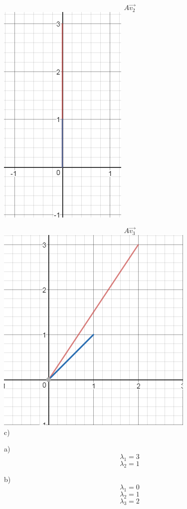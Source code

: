 \documentclass[12pt]{article}
\newenvironment{problem}[2][Problem]{\begin{trivlist}
\item[\hskip \labelsep {\bfseries #1}\hskip \labelsep {\bfseries #2.}]}{\end{trivlist}}
\begin{document}
\[A\vec{v_2} \]
\includegraphics{Av2}

\[A\vec{v_3} \]
\includegraphics{Av3}\\
c)\\

\begin{problem}{12}
\end{problem}
a)\\
\[\lambda_1 = 3\]
\[\lambda_2 = 1\]

b)\\
\[\lambda_1 = 0\]
\[\lambda_2 = 1\]
\[\lambda_3 = 2\]
\end{document}
